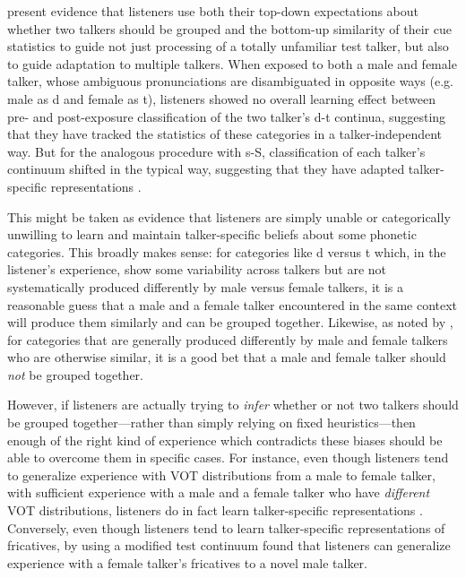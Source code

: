 \textcite{Kraljic2007} present evidence that listeners use both their top-down expectations about whether two talkers should be grouped and the bottom-up similarity of their cue statistics to guide not just processing of a totally unfamiliar test talker, but also to guide adaptation to multiple talkers.  When exposed to both a male and female talker, whose ambiguous pronunciations are disambiguated in opposite ways (e.g. male as \ph d and female as \ph t), listeners showed no overall learning effect between pre- and post-exposure classification of the two talker's \ph d-\ph t continua, suggesting that they have tracked the statistics of these categories in a talker-independent way.  But for the analogous procedure with \ph s-\ph S, classification of each talker's continuum shifted in the typical way, suggesting that they have adapted talker-specific representations \autocite{Kraljic2007}.  

This might be taken as evidence that listeners are simply unable or categorically unwilling to learn and maintain talker-specific beliefs about some phonetic categories.  This broadly makes sense: for categories like \ph d versus \ph t which, in the listener's experience, show some variability across talkers but are not systematically produced differently by male versus female talkers, it is a reasonable guess that a male and a female talker encountered in the same context will produce them similarly and can be grouped together.  Likewise, as noted by \textcite{Kraljic2007}, for categories that are generally produced differently by male and female talkers who are otherwise similar, it is a good bet that a male and female talker should \emph{not} be grouped together.

However, if listeners are actually trying to \emph{infer} whether or not two talkers should be grouped together---rather than simply relying on fixed heuristics---then enough of the right kind of experience which contradicts these biases should be able to overcome them in specific cases.  For instance, even though listeners tend to generalize experience with VOT distributions from a male to female talker, with sufficient experience with a male and a female talker who have \emph{different} VOT distributions, listeners do in fact learn talker-specific representations \autocite{Munson2011}.  Conversely, even though listeners tend to learn talker-specific representations of fricatives, by using a modified test continuum \textcite{Reinisch2014} found that listeners can generalize experience with a female talker's fricatives to a novel male talker.
\label{r1-reinisch1}

